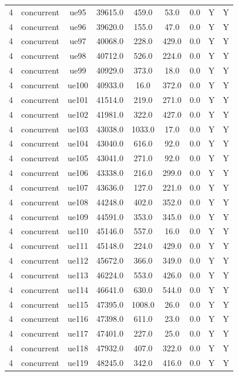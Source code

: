 \begin{table}[ht]
\begin{tabular}{|c|c|c|c|c|c|c|c|c|}
4 & concurrent & ue95 & 39615.0 & 459.0 & 53.0 & 0.0 & Y & Y \\
4 & concurrent & ue96 & 39620.0 & 155.0 & 47.0 & 0.0 & Y & Y \\
4 & concurrent & ue97 & 40068.0 & 228.0 & 429.0 & 0.0 & Y & Y \\
4 & concurrent & ue98 & 40712.0 & 526.0 & 224.0 & 0.0 & Y & Y \\
4 & concurrent & ue99 & 40929.0 & 373.0 & 18.0 & 0.0 & Y & Y \\
4 & concurrent & ue100 & 40933.0 & 16.0 & 372.0 & 0.0 & Y & Y \\
4 & concurrent & ue101 & 41514.0 & 219.0 & 271.0 & 0.0 & Y & Y \\
4 & concurrent & ue102 & 41981.0 & 322.0 & 427.0 & 0.0 & Y & Y \\
4 & concurrent & ue103 & 43038.0 & 1033.0 & 17.0 & 0.0 & Y & Y \\
4 & concurrent & ue104 & 43040.0 & 616.0 & 92.0 & 0.0 & Y & Y \\
4 & concurrent & ue105 & 43041.0 & 271.0 & 92.0 & 0.0 & Y & Y \\
4 & concurrent & ue106 & 43338.0 & 216.0 & 299.0 & 0.0 & Y & Y \\
4 & concurrent & ue107 & 43636.0 & 127.0 & 221.0 & 0.0 & Y & Y \\
4 & concurrent & ue108 & 44248.0 & 402.0 & 352.0 & 0.0 & Y & Y \\
4 & concurrent & ue109 & 44591.0 & 353.0 & 345.0 & 0.0 & Y & Y \\
4 & concurrent & ue110 & 45146.0 & 557.0 & 16.0 & 0.0 & Y & Y \\
4 & concurrent & ue111 & 45148.0 & 224.0 & 429.0 & 0.0 & Y & Y \\
4 & concurrent & ue112 & 45672.0 & 366.0 & 349.0 & 0.0 & Y & Y \\
4 & concurrent & ue113 & 46224.0 & 553.0 & 426.0 & 0.0 & Y & Y \\
4 & concurrent & ue114 & 46641.0 & 630.0 & 544.0 & 0.0 & Y & Y \\
4 & concurrent & ue115 & 47395.0 & 1008.0 & 26.0 & 0.0 & Y & Y \\
4 & concurrent & ue116 & 47398.0 & 611.0 & 23.0 & 0.0 & Y & Y \\
4 & concurrent & ue117 & 47401.0 & 227.0 & 25.0 & 0.0 & Y & Y \\
4 & concurrent & ue118 & 47932.0 & 407.0 & 322.0 & 0.0 & Y & Y \\
4 & concurrent & ue119 & 48245.0 & 342.0 & 416.0 & 0.0 & Y & Y \\

\end{tabular}
\end{table}

